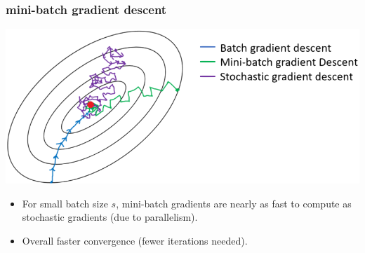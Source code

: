 \documentclass[handout,compress]{beamer}
\begin{document}
\begin{frame}
	\frametitle{mini-batch gradient descent}
	\begin{center}
		\includegraphics[width=.7\textwidth]{sgd_v_batch.png}
	\end{center}
\begin{itemize}
	\item For small batch size $s$, mini-batch gradients are nearly as fast to compute as stochastic gradients (due to parallelism).  
	\item Overall faster convergence (fewer iterations needed). 
\end{itemize}
	
\end{frame}
\end{document}
